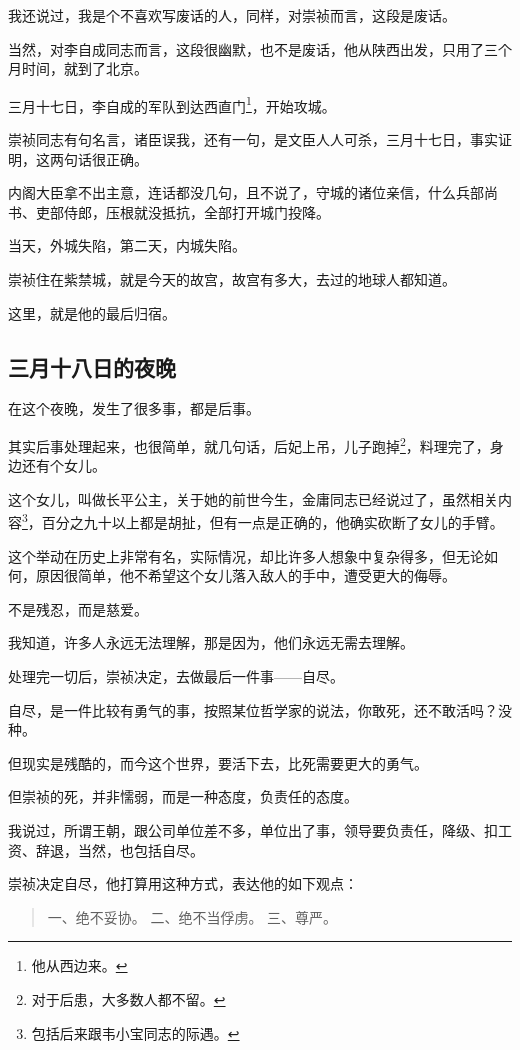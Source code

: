 \begin{multicols}{\theparacolNo}
		我还说过，我是个不喜欢写废话的人，同样，对崇祯而言，这段是废话。

		当然，对李自成同志而言，这段很幽默，也不是废话，他从陕西出发，只用了三个月时间，就到了北京。

		三月十七日，李自成的军队到达西直门\footnote{他从西边来。}，开始攻城。

		崇祯同志有句名言，诸臣误我，还有一句，是文臣人人可杀，三月十七日，事实证明，这两句话很正确。

		内阁大臣拿不出主意，连话都没几句，且不说了，守城的诸位亲信，什么兵部尚书、吏部侍郎，压根就没抵抗，全部打开城门投降。

		当天，外城失陷，第二天，内城失陷。

		崇祯住在紫禁城，就是今天的故宫，故宫有多大，去过的地球人都知道。

		这里，就是他的最后归宿。

		\subsection{三月十八日的夜晚}
		在这个夜晚，发生了很多事，都是后事。

		其实后事处理起来，也很简单，就几句话，后妃上吊，儿子跑掉\footnote{对于后患，大多数人都不留。}，料理完了，身边还有个女儿。

		这个女儿，叫做长平公主，关于她的前世今生，金庸同志已经说过了，虽然相关内容\footnote{包括后来跟韦小宝同志的际遇。}，百分之九十以上都是胡扯，但有一点是正确的，他确实砍断了女儿的手臂。

		这个举动在历史上非常有名，实际情况，却比许多人想象中复杂得多，但无论如何，原因很简单，他不希望这个女儿落入敌人的手中，遭受更大的侮辱。

		不是残忍，而是慈爱。

		我知道，许多人永远无法理解，那是因为，他们永远无需去理解。

		处理完一切后，崇祯决定，去做最后一件事——自尽。

		自尽，是一件比较有勇气的事，按照某位哲学家的说法，你敢死，还不敢活吗？没种。

		但现实是残酷的，而今这个世界，要活下去，比死需要更大的勇气。

		但崇祯的死，并非懦弱，而是一种态度，负责任的态度。

		我说过，所谓王朝，跟公司单位差不多，单位出了事，领导要负责任，降级、扣工资、辞退，当然，也包括自尽。

		崇祯决定自尽，他打算用这种方式，表达他的如下观点：
		{\footnotesize \begin{quote}
			一、绝不妥协。
			二、绝不当俘虏。
			三、尊严。
		\end{quote}}


\end{multicols}
